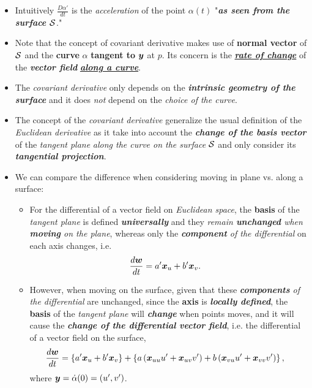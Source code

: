 \documentclass[11pt]{article}
\begin{document}
\begin{itemize}
\item Intuitively $\frac{D\alpha'}{dt}$  is the \emph{acceleration} of the point $\alpha(t)$ "\emph{\textbf{as seen from the surface ${\mathcal S}$}}."

\item Note that the concept of covariant derivative makes use of \textbf{normal vector} of ${\mathcal S}$ and the \textbf{curve} $\alpha$ \textbf{tangent to} $\boldsymbol{y}$ at $p$. Its concern is the \underline{\emph{\textbf{rate of change}}} of the \emph{\textbf{vector field}} \underline{\emph{\textbf{along a curve}}}. 

\item The \emph{covariant derivative} only depends on the \emph{\textbf{intrinsic geometry of the surface}} and it does \emph{not} depend on the \emph{choice of the curve}. 

\item The concept of the \emph{covariant derivative} generalize the usual definition of the \emph{Euclidean derivative} as it take into account the \emph{\textbf{change of the basis vector}} of the \emph{tangent plane} \emph{along the curve on the surface} ${\mathcal S}$ and only consider its \emph{\textbf{tangential projection}}. 

\item We can compare the difference when considering moving in plane vs. along a surface:
\begin{itemize}
\item For the differential of a vector field on \emph{Euclidean space}, the \textbf{basis} of the \emph{tangent plane} is defined \emph{\textbf{universally}} and they \emph{remain \textbf{unchanged} when \textbf{moving} on the plane}, whereas only the \emph{\textbf{component} of the differential} on each axis changes, i.e.
\begin{align*}
\frac{d\boldsymbol{w}}{dt} &= a'\boldsymbol{x}_{u} + b'\boldsymbol{x}_{v}.
\end{align*} 

\item However, when moving on the surface, given that these \emph{\textbf{components} of the differential} are unchanged, since the \textbf{axis} is \textbf{\emph{locally defined}}, the \textbf{basis} of the \emph{tangent plane} will \emph{\textbf{change}} when points moves, and it will cause the \emph{\textbf{change of the differential vector field}}, i.e. the differential of a vector field on the surface, 
\begin{align}
\frac{d\boldsymbol{w}}{dt} &= \left\{a'\boldsymbol{x}_{u} + b'\boldsymbol{x}_{v}\right\} + \left\{a\left(\boldsymbol{x}_{uu}u' + \boldsymbol{x}_{uv}v'\right) + b\left(\boldsymbol{x}_{vu}u' + \boldsymbol{x}_{vv}v'\right)\right\}, \label{eqn: change_of_vector_field}
\end{align} where $\boldsymbol{y} = \dot{\alpha}(0) = (u', v')$. 


\end{itemize}
\end{itemize}
\end{document}

